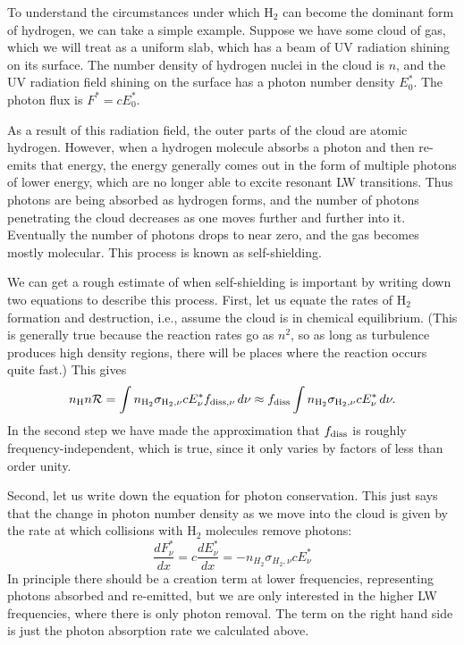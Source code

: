 To understand the circumstances under which H$_2$ can become the dominant form of hydrogen, we can take a simple example. Suppose we have some cloud of gas, which we will treat as a uniform slab, which has a beam of UV radiation shining on its surface. The number density of hydrogen nuclei in the cloud is $n$, and the UV radiation field shining on the surface has a photon number density $E^*_0$. The photon flux is $F^* = c E^*_0$.

As a result of this radiation field, the outer parts of the cloud are atomic hydrogen. However, when a hydrogen molecule absorbs a photon and then re-emits that energy, the energy generally comes out in the form of multiple photons of lower energy, which are no longer able to excite resonant LW transitions. Thus photons are being absorbed as hydrogen forms, and the number of photons penetrating the cloud decreases as one moves further and further into it. Eventually the number of photons drops to near zero, and the gas becomes mostly molecular. This process is known as self-shielding.

We can get a rough estimate of when self-shielding is important by writing down two equations to describe this process. First, let us equate the rates of H$_2$ formation and destruction, i.e., assume the cloud is in chemical equilibrium. (This is generally true because the reaction rates go as $n^2$, so as long as turbulence produces high density regions, there will be places where the reaction occurs quite fast.) This gives
\begin{equation}
\label{eq:chembalance}
n_{\rm H} n \mathcal{R} = \int n_{{\rm H}_2} \sigma_{{\rm H}_2,\nu} c E^*_{\nu} f_{{\rm diss},\nu}\, d\nu
\approx f_{\rm diss}  \int n_{{\rm H}_2} \sigma_{{\rm H}_2,\nu} c E^*_{\nu}\, d\nu.
\end{equation}
In the second step we have made the approximation that $f_{\rm diss}$ is roughly frequency-independent, which is true, since it only varies by factors of less than order unity.

Second, let us write down the equation for photon conservation. This just says that the change in photon number density as we move into the cloud is given by the rate at which collisions with H$_2$ molecules remove photons:
\begin{equation}
\label{eq:dfdx}
\frac{dF^*_{\nu}}{dx}= c \frac{dE^*_{\nu}}{dx} = -n_{H_2} \sigma_{H_2,\nu} c E^*_{\nu}
\end{equation}
In principle there should be a creation term at lower frequencies, representing photons absorbed and re-emitted, but we are only interested in the higher LW frequencies, where there is only photon removal. The term on the right hand side is just the photon absorption rate we calculated above.

